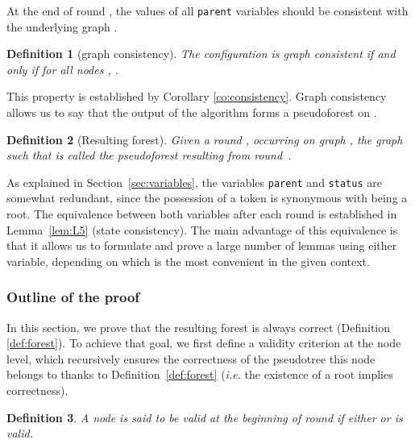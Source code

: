 \documentclass[twocolumn]{article}
\newtheorem{definition}{Definition}
\begin{document}
At the end of round , the values of all \texttt{parent} variables should be consistent with the underlying graph .


\begin{definition}[graph consistency]
The configuration 
is graph consistent if and only if for all nodes ,
.
\end{definition}

This property is established by Corollary \ref{co:consistency}.
Graph consistency allows us to say that the output of the algorithm forms a pseudoforest on .

 
\begin{definition}[Resulting forest]
  \label{def:F_i}
  Given a round , occurring on graph , the graph  such that  is called the {\em pseudoforest} resulting from round~. 
\end{definition}

\FloatBarrier

As explained in Section~\ref{sec:variables}, the variables {\tt parent} and {\tt status} are somewhat redundant, since the possession of a token is synonymous with being a root. The equivalence between both variables after each round is established in Lemma~\ref{lem:L5} (state consistency). The main advantage of this equivalence is that it allows us to formulate and prove a large number of lemmas using either variable, depending on which is the most convenient in the given context.

\subsubsection{Outline of the proof}


In this section, we prove that the resulting forest is always correct (Definition \ref{def:forest}). 
To achieve that goal, 
we first define a validity criterion at the node level, which recursively ensures the correctness of the pseudotree this node belongs to thanks to Definition~\ref{def:forest} ({\it i.e.} the existence of a root implies correctness).



\begin{definition}
A node  is said to be valid at the beginning of round  if either  or  is valid. 
\end{definition}
\end{document}
